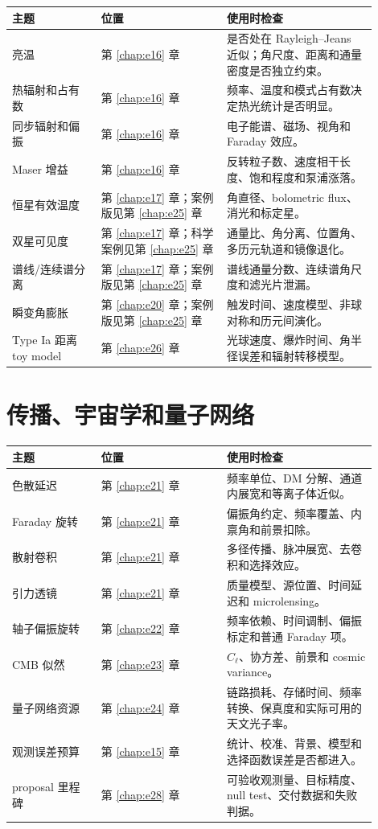 \begin{longtable}{p{0.22\linewidth}p{0.31\linewidth}p{0.37\linewidth}}
\toprule
主题 & 位置 & 使用时检查 \\
\midrule
亮温 & 第 \ref{chap:e16} 章 & 是否处在 Rayleigh--Jeans 近似；角尺度、距离和通量密度是否独立约束。 \\
热辐射和占有数 & 第 \ref{chap:e16} 章 & 频率、温度和模式占有数决定热光统计是否明显。 \\
同步辐射和偏振 & 第 \ref{chap:e16} 章 & 电子能谱、磁场、视角和 Faraday 效应。 \\
Maser 增益 & 第 \ref{chap:e16} 章 & 反转粒子数、速度相干长度、饱和程度和泵浦涨落。 \\
恒星有效温度 & 第 \ref{chap:e17} 章；案例版见第 \ref{chap:e25} 章 & 角直径、bolometric flux、消光和标定星。 \\
双星可见度 & 第 \ref{chap:e17} 章；科学案例见第 \ref{chap:e25} 章 & 通量比、角分离、位置角、多历元轨道和镜像退化。 \\
谱线/连续谱分离 & 第 \ref{chap:e17} 章；案例版见第 \ref{chap:e25} 章 & 谱线通量分数、连续谱角尺度和滤光片泄漏。 \\
瞬变角膨胀 & 第 \ref{chap:e20} 章；案例版见第 \ref{chap:e25} 章 & 触发时间、速度模型、非球对称和历元间演化。 \\
Type Ia 距离 toy model & 第 \ref{chap:e26} 章 & 光球速度、爆炸时间、角半径误差和辐射转移模型。 \\
\bottomrule
\end{longtable}

\section{传播、宇宙学和量子网络}
\label{appsec:a-propagation-network}

\begin{longtable}{p{0.22\linewidth}p{0.31\linewidth}p{0.37\linewidth}}
\toprule
主题 & 位置 & 使用时检查 \\
\midrule
色散延迟 & 第 \ref{chap:e21} 章 & 频率单位、DM 分解、通道内展宽和等离子体近似。 \\
Faraday 旋转 & 第 \ref{chap:e21} 章 & 偏振角约定、频率覆盖、内禀角和前景扣除。 \\
散射卷积 & 第 \ref{chap:e21} 章 & 多径传播、脉冲展宽、去卷积和选择效应。 \\
引力透镜 & 第 \ref{chap:e21} 章 & 质量模型、源位置、时间延迟和 microlensing。 \\
轴子偏振旋转 & 第 \ref{chap:e22} 章 & 频率依赖、时间调制、偏振标定和普通 Faraday 项。 \\
CMB 似然 & 第 \ref{chap:e23} 章 & \(C_\ell\)、协方差、前景和 cosmic variance。 \\
量子网络资源 & 第 \ref{chap:e24} 章 & 链路损耗、存储时间、频率转换、保真度和实际可用的天文光子率。 \\
观测误差预算 & 第 \ref{chap:e15} 章 & 统计、校准、背景、模型和选择函数误差是否都进入。 \\
proposal 里程碑 & 第 \ref{chap:e28} 章 & 可验收观测量、目标精度、null test、交付数据和失败判据。 \\
\bottomrule
\end{longtable}
